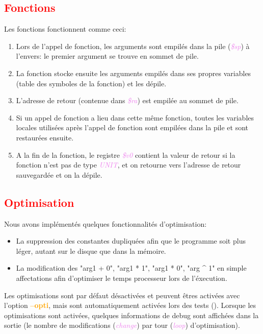 \documentclass[a4paper]{article}
\let\oldtextbf\textbf
\renewcommand{\textbf}[1]{\textcolor{orange}{\oldtextbf{#1}}}
\let\oldtextit\textit
\renewcommand{\textit}[1]{\textcolor{violet}{\oldtextit{#1}}}
\newcommand{\csection}[1]{\textcolor{red}{\section{#1}}}
\begin{document}
\csection{Fonctions}

Les fonctions fonctionnent comme ceci:
\begin{enumerate}
    \item Lors de l'appel de fonction, les arguments sont empilés dans la pile (\textit{\$sp}) à l'envers: le premier argument se trouve en sommet de pile.
    \item La fonction stocke ensuite les arguments empilés dans ses propres variables (table des symboles de la fonction) et les dépile.
    \item L'adresse de retour (contenue dans \textit{\$ra}) est empilée au sommet de pile.
    \item Si un appel de fonction a lieu dans cette même fonction, toutes les variables locales utilisées après l'appel de fonction sont empilées dans la pile et sont restaurées ensuite.
    \item A la fin de la fonction, le registre \textit{\$v0} contient la valeur de retour si la fonction n'est pas de type \textit{UNIT}, et on retourne vers l'adresse de retour sauvegardée et on la dépile.
\end{enumerate}

\csection{Optimisation}

Nous avons implémentés quelques fonctionnalités d'optimisation:
\begin{itemize}
    \item La suppression des constantes dupliquées afin que le programme soit plus léger, autant sur le disque que dans la mémoire.
    \item La modification des "arg1 + 0", "arg1 * 1", "arg1 * 0", "arg ^ 1" en simple affectations afin d'optimiser le temps processeur lors de l'éxecution.
\end{itemize}

Les optimisations sont par défaut désactivées et peuvent êtres activées avec l'option \textbf{--opti}, mais sont automatiquement activées lors des tests ().
Lorsque les optimisations sont activées, quelques informations de debug sont affichées dans la sortie (le nombre de modifications (\textit{change}) par tour (\textit{loop}) d'optimisation).
\end{document}
